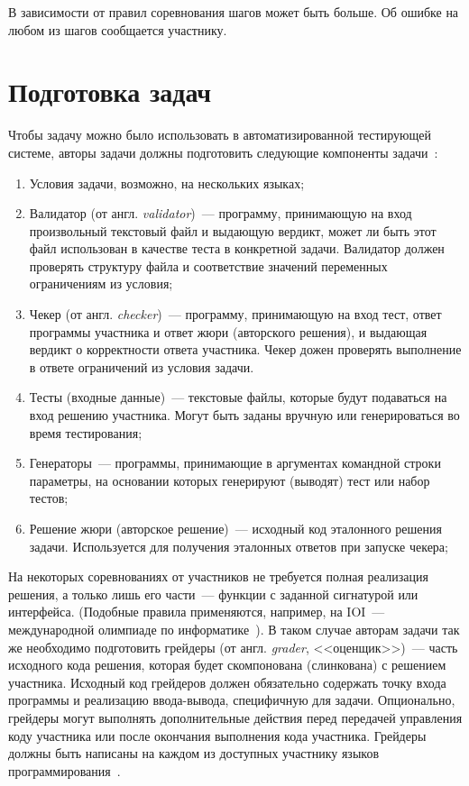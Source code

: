 \documentclass[times,specification,annotation]{style/itmo-student-thesis/itmo-student-thesis}
\begin{document}
В зависимости от правил соревнования шагов может быть больше. Об ошибке на любом из шагов сообщается участнику.

\section{Подготовка задач}

Чтобы задачу можно было использовать в автоматизированной тестирующей системе, авторы задачи должны подготовить следующие компоненты задачи~\cite{darkcyan-polygon-tutorial}:

\begin{enumerate}
    \item Условия задачи, возможно, на нескольких языках;
    \item Валидатор (от англ. \textit{validator})~--- программу, принимающую на вход произвольный текстовый файл и выдающую вердикт, может ли быть этот файл использован в качестве теста в конкретной задачи. Валидатор должен проверять структуру файла и соответствие значений переменных ограничениям из условия;
    \item Чекер (от англ. \textit{checker})~--- программу, принимающую на вход тест, ответ программы участника и ответ жюри (авторского решения), и выдающая вердикт о корректности ответа участника. Чекер дожен проверять выполнение в ответе ограничений из условия задачи.
    \item Тесты (входные данные)~--- текстовые файлы, которые будут подаваться на вход решению участника. Могут быть заданы вручную или генерироваться во время тестирования;
    \item Генераторы~--- программы, принимающие в аргументах командной строки параметры, на основании которых генерируют (выводят) тест или набор тестов;
    \item Решение жюри (авторское решение)~--- исходный код эталонного решения задачи. Используется для получения эталонных ответов при запуске чекера;
\end{enumerate}

На некоторых соревнованиях от участников не требуется полная реализация решения, а только лишь его части~--- функции с заданной сигнатурой или интерфейса. (Подобные правила применяются, например, на IOI~--- международной олимпиаде по информатике~\cite{ioi-rules}). В таком случае авторам задачи так же необходимо подготовить грейдеры (от англ. \textit{grader}, <<оценщик>>)~--- часть исходного кода решения, которая будет скомпонована (слинкована) с решением участника. Исходный код грейдеров должен обязательно содержать точку входа программы и реализацию ввода-вывода, специфичную для задачи. Опционально, грейдеры могут выполнять дополнительные действия перед передачей управления коду участника или после окончания выполнения кода участника. Грейдеры должны быть написаны на каждом из доступных участнику языков программирования~\cite{cf-graders}.
\end{document}
